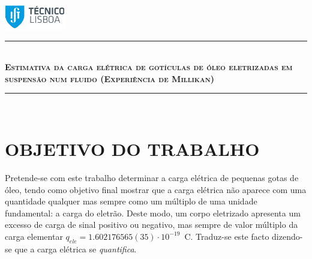 \documentclass[a4paper,twoside,12pt]{article}      %
\author{Prof. Bernardo B. Carvalho}
\date{ Setembro 2012}
\newcommand{\HRule}{\rule{\linewidth}{0.5mm}}
\begin{document}
 

    \includegraphics[width=0.2\textwidth]{../../logo-ist}%

        \HRule \\[0.5cm]
    { \large \bfseries   \textsc{Estimativa da carga elétrica de 
        gotículas de óleo eletrizadas em suspensão num fluido (Experiência de Millikan)} }\\[0.4cm] %
    \HRule \\%




        \section{\sf OBJETIVO DO TRABALHO}
        Pretende-se com este trabalho determinar a carga elétrica de pequenas gotas de óleo, tendo como objetivo final mostrar que a carga elétrica não aparece com uma quantidade qualquer mas sempre como um múltiplo de uma unidade fundamental: a carga do eletrão. Deste modo, um corpo eletrizado apresenta um excesso de carga de sinal positivo ou negativo, mas sempre de valor múltiplo da carga elementar $q_{ele}= 1.602176565(35)\cdot 10^{-19}\,$ C.
        Traduz-se este facto dizendo-se que a carga elétrica se \emph{quantifica}.
\end{document}
